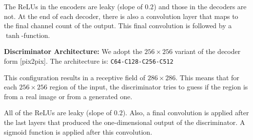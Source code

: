 \documentclass{llncs}
\begin{document}
\begin{subappendices}
The ReLUs in the encoders are leaky (slope of $0.2$) and those in the decoders are not. At the end of each decoder, there is also a convolution layer that maps to the final channel count of the output. This final convolution is followed by a $\tanh$-function.

\noindent\textbf{Discriminator Architecture:}
We adopt the $256\times256$ variant of the decoder form [pix2pix]. The architecture is: \texttt{C64-C128-C256-C512}

This configuration results in a receptive field of $286\times286$. This means that for each $256\times256$ region of the input, the discriminator tries to guess if the region is from a real image or from a generated one.

All of the ReLUs are leaky (slope of $0.2$). Also, a final convolution is applied after the last layers that produced the one-dimensional output of the discriminator. A sigmoid function is applied after this convolution.
\end{subappendices}
\end{document}

